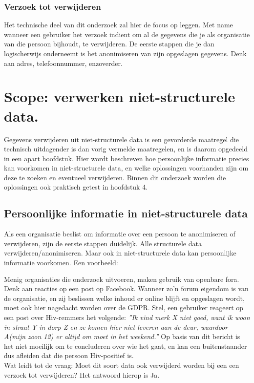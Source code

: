 \subsubsection{Verzoek tot verwijderen}
Het technische deel van dit onderzoek zal hier de focus op leggen. Met name wanneer een gebruiker het verzoek indient om al de gegevens die je als organisatie van die persoon bijhoudt, te verwijderen. De eerste stappen die je dan logischerwijs onderneemt is het anonimiseren van zijn opgeslagen gegevens. Denk aan adres, telefoonnummer, enzoverder. 

 

\section{Scope: verwerken niet-structurele data.}

Gegevens verwijderen uit niet-structurele data is een gevorderde maatregel die technisch uitdagender is dan vorig vermelde maatregelen, en is daarom opgedeeld in een apart hoofdstuk. Hier wordt 
beschreven hoe persoonlijke informatie precies kan voorkomen in niet-structurele data, en welke oplossingen voorhanden zijn om deze te zoeken en eventueel verwijderen. Binnen dit onderzoek
worden die oplossingen ook praktisch getest in hoofdstuk 4. 

\subsection{Persoonlijke informatie in niet-structurele data}
Als een organisatie beslist om informatie over een persoon te anonimiseren of verwijderen, zijn de eerste stappen duidelijk. Alle structurele data verwijderen/anonimiseren. Maar ook in niet-structurele data kan persoonlijke informatie voorkomen. Een voorbeeld: 

Menig organisaties die onderzoek uitvoeren, maken gebruik van openbare fora. Denk aan reacties op een post op Facebook. Wanneer zo'n forum eigendom is van de organisatie, en zij beslissen welke inhoud er online blijft en opgeslagen wordt, moet ook hier nagedacht worden over de GDPR. Stel, een gebruiker reageert op een post over Hiv-remmers het volgende: \textit{”Ik vind merk X niet goed, want ik woon in straat Y in dorp Z en ze komen hier niet leveren aan de deur, waardoor A(mijn zoon 12) er altijd om moet in het weekend.”}
Op basis van dit bericht is het niet moeilijk om te concluderen over wie het gaat, en kan een buitenstaander dus afleiden dat die persoon Hiv-positief is. \\ Wat leidt tot de vraag: Moet dit soort data ook verwijderd worden bij een een verzoek tot verwijderen? Het antwoord hierop is Ja.

